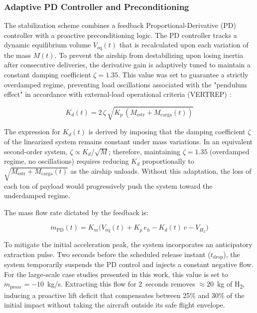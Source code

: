\documentclass[aerospace,article,submit,pdftex,moreauthors]{Definitions/mdpi}
\begin{document}
\subsubsection{Adaptive PD Controller and Preconditioning}
The stabilization scheme combines a feedback Proportional-Derivative (PD) controller with a proactive preconditioning logic. The PD controller tracks a dynamic equilibrium volume $V_\text{eq}(t)$ that is recalculated upon each variation of the mass $M(t)$. To prevent the airship from destabilizing upon losing inertia after consecutive deliveries, the derivative gain is adaptively tuned to maintain a constant damping coefficient $\zeta = 1.35$. This value was set to guarantee a strictly overdamped regime, preventing load oscillations associated with the "pendulum effect" in accordance with external-load operational criteria (VERTREP) \cite{ref7, ref8}:

\begin{equation}
K_d(t) = 2\,\zeta\,\sqrt{K_p\,(M_\text{estr} + M_\text{carga}(t))}
\end{equation}

The expression for $K_d(t)$ is derived by imposing that the damping coefficient $\zeta$ of the linearized system remains constant under mass variations. In an equivalent second-order system, $\zeta \propto K_d/\sqrt{M}$; therefore, maintaining $\zeta = 1.35$ (overdamped regime, no oscillations) requires reducing $K_d$ proportionally to $\sqrt{M_\text{estr} + M_\text{carga}(t)}$ as the airship unloads. Without this adaptation, the loss of each ton of payload would progressively push the system toward the underdamped regime.

The mass flow rate dictated by the feedback is:

\begin{equation}
\dot{m}_\text{PD}(t) = K_m\bigl(V_\text{eq}(t) + K_p\,e_h - K_d(t)\,v - V_{H_2}\bigr)
\end{equation}

To mitigate the initial acceleration peak, the system incorporates an anticipatory extraction pulse. Two seconds before the scheduled release instant ($t_\text{drop}$), the system temporarily suspends the PD control and injects a constant negative flow. For the large-scale case studies presented in this work, this value is set to $\dot{m}_\text{proac} = -10$~kg/s. Extracting this flow for 2~seconds removes ${\approx}20$~kg of H\textsubscript{2}, inducing a proactive lift deficit that compensates between 25\% and 30\% of the initial impact without taking the aircraft outside its safe flight envelope.
\end{document}
